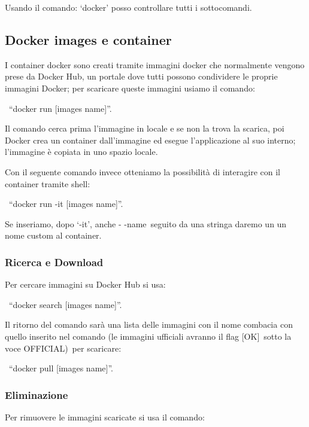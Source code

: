 \documentclass[
]{article}
\begin{document}
{Usando il comando: `docker' posso controllare tutti i sottocomandi.}

{}

\subsection{\texorpdfstring{{Docker images e
container}}{Docker images e container}}\label{h.apoi1uqrh76t}

{I container docker sono creati tramite immagini docker che normalmente
vengono prese da Docker Hub, un portale dove tutti possono condividere
le proprie immagini Docker; per scaricare queste immagini usiamo il
comando:}

{~``}{docker run {[}images name{]}}{''.}

{Il comando cerca prima l'immagine in locale e se non la trova la
scarica, poi Docker crea un container dall'immagine ed esegue
l'applicazione al suo interno; l'immagine è copiata in uno spazio
locale.}

{Con il seguente comando invece otteniamo la possibilità di interagire
con il container tramite shell:}

{~``}{docker run -it {[}images name{]}}{''.}

{Se inseriamo, dopo `-it', anche }{- -name}{~seguito da una stringa
daremo un un nome custom al container.}

{}

\subsubsection{\texorpdfstring{{Ricerca e
Download}}{Ricerca e Download}}\label{h.jnulye2h3fue}

{Per cercare immagini su Docker Hub si usa:}

{~``}{docker search {[}images name{]}}{''.}

{Il ritorno del comando sarà una lista delle immagini con il nome
combacia con quello inserito nel comando (le immagini ufficiali avranno
il flag }{{[}OK{]}}{~sotto la voce }{OFFICIAL)}{~per scaricare:}

{~``}{docker pull {[}images name{]}}{''.}

{}

\subsubsection{\texorpdfstring{{Eliminazione}}{Eliminazione}}\label{h.9o4n5zq2mqkf}

{Per rimuovere le immagini scaricate si usa il comando:}
\end{document}
